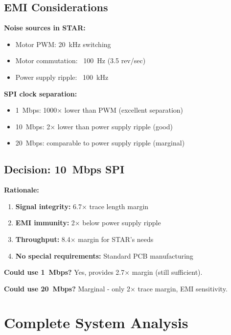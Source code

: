 \documentclass[12pt,letterpaper]{article}
\begin{document}
\subsection{EMI Considerations}

\textbf{Noise sources in STAR:}
\begin{itemize}
    \item Motor PWM: 20~kHz switching
    \item Motor commutation: ~100~Hz (3.5 rev/sec)
    \item Power supply ripple: ~100~kHz
\end{itemize}

\textbf{SPI clock separation:}
\begin{itemize}
    \item 1~Mbps: 1000× lower than PWM (excellent separation)
    \item 10~Mbps: 2× lower than power supply ripple (good)
    \item 20~Mbps: comparable to power supply ripple (marginal)
\end{itemize}

\subsection{Decision: 10~Mbps SPI}

\textbf{Rationale:}
\begin{enumerate}
    \item \textbf{Signal integrity:} 6.7× trace length margin
    \item \textbf{EMI immunity:} 2× below power supply ripple
    \item \textbf{Throughput:} 8.4× margin for STAR's needs
    \item \textbf{No special requirements:} Standard PCB manufacturing
\end{enumerate}

\textbf{Could use 1~Mbps?} Yes, provides 2.7× margin (still sufficient).

\textbf{Could use 20~Mbps?} Marginal - only 2× trace margin, EMI sensitivity.

\section{Complete System Analysis}
\end{document}
